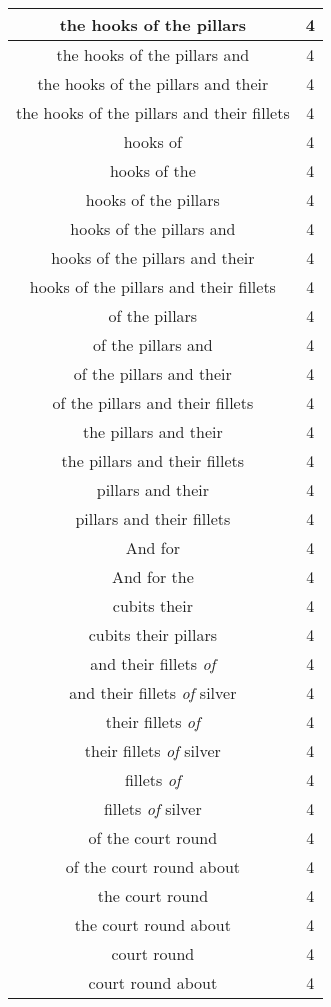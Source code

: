 \begin{center}
\begin{longtable}{|c|c|}
the hooks of the pillars & 4\\ \hline 
the hooks of the pillars and & 4\\ \hline 
the hooks of the pillars and their & 4\\ \hline 
the hooks of the pillars and their fillets & 4\\ \hline 
hooks of & 4\\ \hline 
hooks of the & 4\\ \hline 
hooks of the pillars & 4\\ \hline 
hooks of the pillars and & 4\\ \hline 
hooks of the pillars and their & 4\\ \hline 
hooks of the pillars and their fillets & 4\\ \hline 
of the pillars & 4\\ \hline 
of the pillars and & 4\\ \hline 
of the pillars and their & 4\\ \hline 
of the pillars and their fillets & 4\\ \hline 
the pillars and their & 4\\ \hline 
the pillars and their fillets & 4\\ \hline 
pillars and their & 4\\ \hline 
pillars and their fillets & 4\\ \hline 
And for & 4\\ \hline 
And for the & 4\\ \hline 
cubits their & 4\\ \hline 
cubits their pillars & 4\\ \hline 
and their fillets \emph{of} & 4\\ \hline 
and their fillets \emph{of} silver & 4\\ \hline 
their fillets \emph{of} & 4\\ \hline 
their fillets \emph{of} silver & 4\\ \hline 
fillets \emph{of} & 4\\ \hline 
fillets \emph{of} silver & 4\\ \hline 
of the court round & 4\\ \hline 
of the court round about & 4\\ \hline 
the court round & 4\\ \hline 
the court round about & 4\\ \hline 
court round & 4\\ \hline 
court round about & 4\\ \hline 

\end{longtable}
\end{center}
